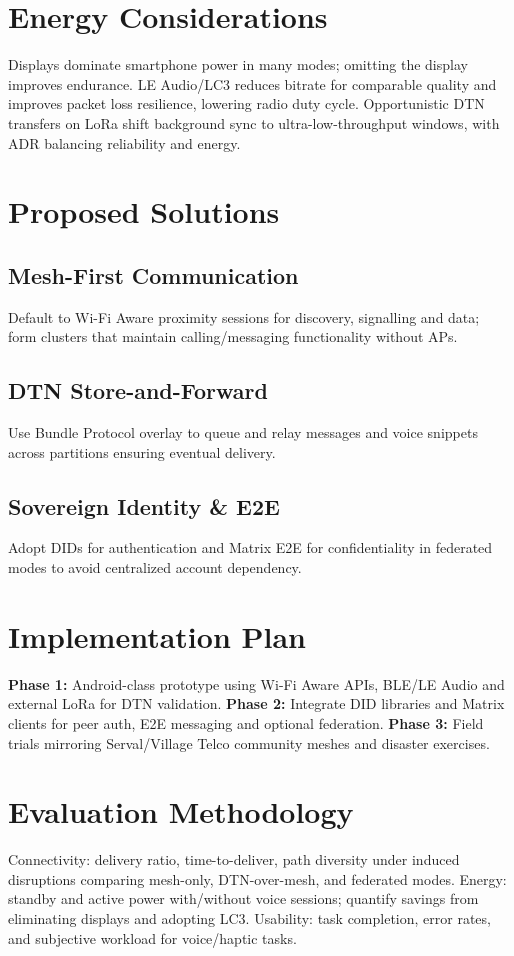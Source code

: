 \documentclass[10pt,journal,compsoc]{IEEEtran}
\begin{document}
\section{Energy Considerations}
Displays dominate smartphone power in many modes; omitting the display improves endurance. LE Audio/LC3 reduces bitrate for comparable quality and improves packet loss resilience, lowering radio duty cycle. Opportunistic DTN transfers on LoRa shift background sync to ultra-low-throughput windows, with ADR balancing reliability and energy.

\section{Proposed Solutions}
\subsection{Mesh-First Communication}
Default to Wi-Fi Aware proximity sessions for discovery, signalling and data; form clusters that maintain calling/messaging functionality without APs.

\subsection{DTN Store-and-Forward}
Use Bundle Protocol overlay to queue and relay messages and voice snippets across partitions ensuring eventual delivery.

\subsection{Sovereign Identity \& E2E}
Adopt DIDs for authentication and Matrix E2E for confidentiality in federated modes to avoid centralized account dependency.

\section{Implementation Plan}
\textbf{Phase 1:} Android-class prototype using Wi-Fi Aware APIs, BLE/LE Audio and external LoRa for DTN validation.  
\textbf{Phase 2:} Integrate DID libraries and Matrix clients for peer auth, E2E messaging and optional federation.  
\textbf{Phase 3:} Field trials mirroring Serval/Village Telco community meshes and disaster exercises.

\section{Evaluation Methodology}
Connectivity: delivery ratio, time-to-deliver, path diversity under induced disruptions comparing mesh-only, DTN-over-mesh, and federated modes.  
Energy: standby and active power with/without voice sessions; quantify savings from eliminating displays and adopting LC3.  
Usability: task completion, error rates, and subjective workload for voice/haptic tasks.
\end{document}

